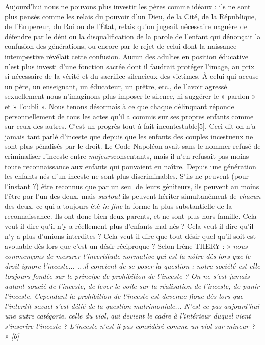  Aujourd'hui nous ne pouvons plus investir les pères comme idéaux : ils ne sont plus pensés comme les relais du pouvoir d'un Dieu, de la Cité, de la République, de l'Empereur, du Roi ou de l'État, relais qu'on jugeait nécessaire naguère de défendre par le déni ou la disqualification de la parole de l'enfant qui dénonçait la confusion des générations, ou encore par le rejet de celui dont la naissance intempestive révélait cette confusion. Aucun des adultes en position éducative n'est plus investi d'une fonction sacrée dont il faudrait protéger l'image, au prix si nécessaire de la vérité et du sacrifice silencieux des victimes. À celui qui accuse un père, un enseignant, un éducateur, un prêtre, etc., de l'avoir agressé sexuellement nous n'imaginons plus imposer le silence, ni suggérer le » pardon » et » l'oubli ». Nous tenons désormais à ce que chaque délinquant réponde personnellement de tous les actes qu'il a commis sur ses propres enfants comme sur ceux des autres. C'est un progrès tout à fait incontestable[5]. 
 Ceci dit on n'a jamais tant parlé d'inceste que depuis que les enfants des couples incestueux ne sont plus pénalisés par le droit. Le Code Napoléon avait sans le nommer refusé de criminaliser l'inceste entre \emph{majeurs}consentants, mais il n'en refusait pas moins toute reconnaissance aux enfants qui pouvaient en naître. Depuis une génération les enfants nés d'un inceste ne sont plus discriminables. S'ils ne peuvent (pour l'instant ?) être reconnus que par un seul de leurs géniteurs, ils peuvent au moins l'être par l'un des deux, mais \emph{surtout} ils peuvent hériter simultanément de \emph{chacun} des deux, ce qui a toujours été \emph{in fine} la forme la plus substantielle de la reconnaissance. Ils ont donc bien deux parents, et ne sont plus hors famille. 
 Cela veut-il dire qu'il n'y a réellement plus d'enfants mal nés ? Cela veut-il dire qu'il n'y a plus d'unions interdites ? Cela veut-il dire que tout désir quel qu'il soit est avouable dès lors que c'est un désir réciproque ? 
 Selon Irène THERY : » \emph{nous commençons de mesurer l'incertitude normative qui est la nôtre dès lors que le droit ignore l'inceste... ...il convient de se poser la question : notre société est-elle toujours fondée sur le principe de prohibition de l'inceste ? On ne s'est jamais autant soucié de l'inceste, de lever le voile sur la réalisation de l'inceste, de punir l'inceste. Cependant la prohibition de l'inceste est devenue floue dès lors que l'interdit sexuel s'est délié de la question matrimoniale... N'est-ce pas aujourd'hui une autre catégorie, celle du viol, qui devient le cadre à l'intérieur duquel vient s'inscrire l'inceste ? L'inceste n'est-il pas considéré comme un viol sur mineur ? » [6]}
 
